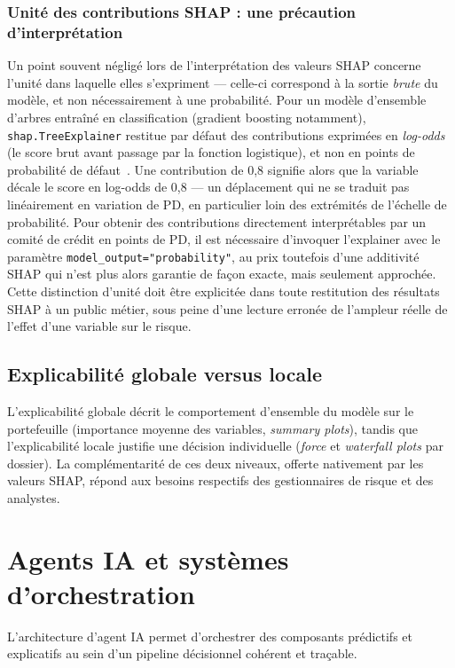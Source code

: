 \documentclass[a4paper,12pt,oneside]{report}
\begin{document}
\subsubsection{Unité des contributions SHAP : une précaution d'interprétation}

Un point souvent négligé lors de l'interprétation des valeurs SHAP concerne l'unité dans
laquelle elles s'expriment — celle-ci correspond à la sortie \emph{brute} du modèle, et non
nécessairement à une probabilité. Pour un modèle d'ensemble d'arbres entraîné en classification
(gradient boosting notamment), \texttt{shap.TreeExplainer} restitue par défaut des contributions
exprimées en \textit{log-odds} (le score brut avant passage par la fonction logistique), et non
en points de probabilité de défaut~\cite{shapdoc}. Une contribution de 0,8 signifie alors que la
variable décale le score en log-odds de 0,8 — un déplacement qui ne se traduit pas linéairement
en variation de PD, en particulier loin des extrémités de l'échelle de probabilité. Pour obtenir
des contributions directement interprétables par un comité de crédit en points de PD, il est
nécessaire d'invoquer l'explainer avec le paramètre \texttt{model\_output="probability"}, au prix
toutefois d'une additivité SHAP qui n'est plus alors garantie de façon exacte, mais seulement
approchée. Cette distinction d'unité doit être explicitée dans toute restitution des résultats
SHAP à un public métier, sous peine d'une lecture erronée de l'ampleur réelle de l'effet d'une
variable sur le risque.

\subsection{Explicabilité globale versus locale}

L'explicabilité globale décrit le comportement d'ensemble du modèle sur le portefeuille
(importance moyenne des variables, \textit{summary plots}), tandis que l'explicabilité locale
justifie une décision individuelle (\textit{force} et \textit{waterfall plots} par dossier). La
complémentarité de ces deux niveaux, offerte nativement par les valeurs SHAP, répond aux
besoins respectifs des gestionnaires de risque et des analystes.

\section{Agents IA et systèmes d'orchestration}

L'architecture d'agent IA permet d'orchestrer des composants prédictifs et explicatifs au
sein d'un pipeline décisionnel cohérent et traçable.
\end{document}
